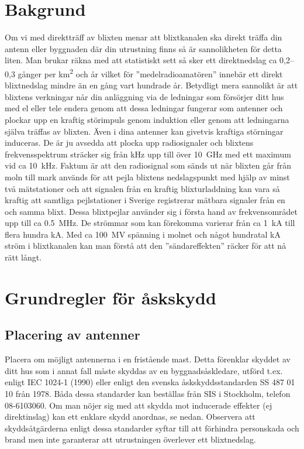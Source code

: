 \section{Bakgrund}
Om vi med direktträff av blixten menar att blixtkanalen ska direkt träffa din
antenn eller byggnaden där din utrustning finns så är sannolikheten för detta
liten.
Man brukar räkna med att statistiskt sett så sker ett direktnedslag ca 0,2--0,3
gånger per \unit{\kilo\metre\squared} och år vilket för ''medelradioamatören''
innebär ett direkt blixtnedslag mindre än en gång vart hundrade år.
Betydligt mera sannolikt är att blixtens verkningar når din anläggning via de
ledningar som försörjer ditt hus med el eller tele endera genom att dessa
ledningar fungerar som antenner och plockar upp en kraftig störimpuls genom
induktion eller genom att ledningarna själva träffas av blixten.
Även i dina antenner kan givetvis kraftiga störningar induceras.
De är ju avsedda att plocka upp radiosignaler och blixtens frekvensspektrum
sträcker sig från \unit{\kilo\hertz} upp till över \qty{10}{\giga\hertz} med ett
maximum vid ca \qty{10}{\kilo\hertz}.
Faktum är att den radiosignal som sänds ut när blixten går från moln till mark
används för att pejla blixtens nedslagspunkt med hjälp av minst två mätstationer
och att signalen från en kraftig blixturladdning kan vara så kraftig att
samtliga pejlstationer i Sverige registrerar mätbara signaler från en och samma
blixt.
Dessa blixtpejlar använder sig i första hand av frekvensområdet upp till ca
\qty{0,5}{\mega\hertz}.
De strömmar som kan förekomma varierar från ca \qty{1}{\kilo\ampere} till flera
hundra \unit{\kilo\ampere}.
Med ca \qty{100}{\mega\volt} spänning i molnet och något hundratal
\unit{\kilo\ampere} ström i blixtkanalen kan man förstå att den
''sändareffekten'' räcker för att nå rätt långt.

\section{Grundregler för åskskydd}
\subsection{Placering av antenner}
Placera om möjligt antennerna i en fristående mast.
Detta förenklar skyddet av ditt hus som i annat fall måste skyddas av en
byggnadsåskledare, utförd t.ex. enligt IEC 1024-1 (1990) eller enligt den svenska
åskskyddsstandarden SS 487 01 10 från 1978.
Båda dessa standarder kan beställas från SIS i Stockholm, telefon 08-6103060.
Om man nöjer sig med att skydda mot inducerade effekter (ej direktinslag) kan
ett enklare skydd anordnas, se nedan.
Observera att skyddsåtgärderna enligt dessa standarder syftar till att förhindra
personskada och brand men inte garanterar att utrustningen överlever ett
blixtnedslag.

